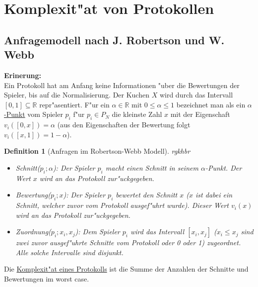 \documentclass[11pt, a4paper, twoside]{article}
\newcommand{\wf}{\color{white}}
\newcommand{\tf}{\color{black}}
\newtheorem{defi}[satz]{Definition}
\numberwithin{equation}{section}
\begin{document}
\section{Komplexit"at von Protokollen}
\subsection{Anfragemodell nach J. Robertson und W. Webb}
\textbf{Erinerung:}\\
Ein Protokoll hat am Anfang keine Informationen "uber die Bewertungen der Spieler, bis auf die Normalisierung. Der Kuchen $X$ wird durch das Intervall $[0,1]\subseteq \mathbb{R}$ repr"asentiert. F"ur ein $\alpha \in \mathbb{R}$ mit $0 \leq \alpha \leq 1$ bezeichnet man als ein \underline{$\alpha$-Punkt} vom Spieler $p_i$ f"ur $p_i \in P_N$ die kleinste Zahl $x$ mit der Eigenschaft $v_i([0,x])=\alpha$ (aus den Eigenschaften der Bewertung folgt $v_i([x,1])=1-\alpha$).
\begin{defi}[Anfragen im Robertson-Webb Modell] \wf rgkhbr \tf \\
\begin{itemize}
\item Schnitt($p_i;\alpha$): Der Spieler $p_i$ macht einen Schnitt in seinem $\alpha$-Punkt. Der Wert $x$ wird an das Protokoll zur"uckgegeben.\\
\item Bewertung($p_i;x$): Der Spieler $p_i$ bewertet den Schnitt $x$ ($x$ ist dabei ein Schnitt, welcher zuvor vom Protokoll ausgef"uhrt wurde). Dieser Wert $v_i(x)$ wird an das Protokoll zur"uckgegeben.\\
\item Zuordnung($p_i;x_i,x_j$): Dem Spieler $p_i$ wird das Intervall $[x_i,x_j]$ ($x_i \leq x_j$ sind zwei zuvor ausgef"uhrte Schnitte vom Protokoll oder 0 oder 1) zugeordnet. Alle solche Intervalle sind disjunkt.
\end{itemize}  
\end{defi}
Die \underline{Komplexit"at eines Protokolls} ist die Summe der Anzahlen der Schnitte und Bewertungen im worst case.
\end{document}
